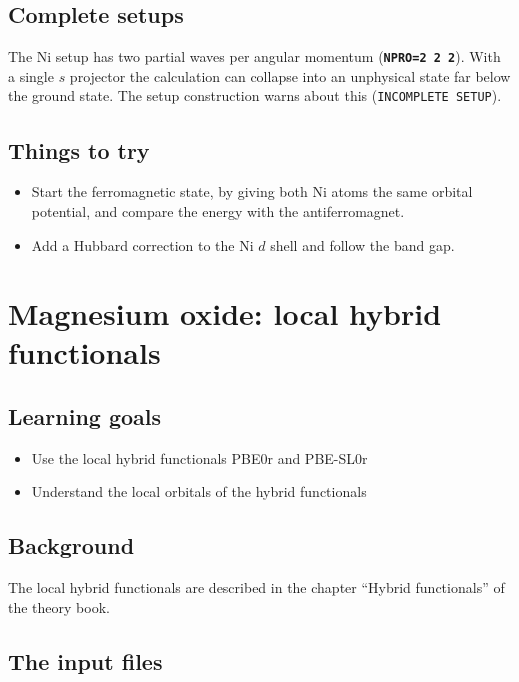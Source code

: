 \documentclass[11pt,a4paper,oneside]{book}
\newcommand{\key}[1]{\textbf{\texttt{#1}}}
\newcommand{\goals}{\section{Learning goals}}
\newcommand{\background}{\section{Background}}
\begin{document}
\section{Complete setups}

The Ni setup has two partial waves per angular momentum
(\key{NPRO=2 2 2}). With a single $s$ projector the calculation can
collapse into an unphysical state far below the ground state. The setup
construction warns about this (\texttt{INCOMPLETE SETUP}).

\section{Things to try}
\begin{itemize}
\item Start the ferromagnetic state, by giving both Ni atoms the same
  orbital potential, and compare the energy with the antiferromagnet.
\item Add a Hubbard correction to the Ni $d$ shell and follow the band
  gap.
\end{itemize}

\chapter{Magnesium oxide: local hybrid functionals}
\minitoc

\goals
\begin{itemize}
\item Use the local hybrid functionals PBE0r and PBE-SL0r
\item Understand the local orbitals of the hybrid functionals
\end{itemize}

\background
The local hybrid functionals are described in the chapter ``Hybrid
functionals'' of the theory book.

\section{The input files}
\end{document}

